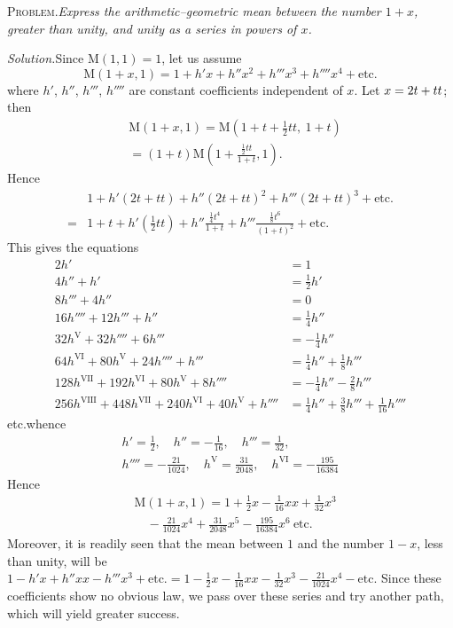 \begingroup
\renewcommand{\arraystretch}{1.45}

\textsc{Problem.}\quad \textit{Express the arithmetic–geometric mean between the number $1+x$, greater than unity, and unity as a series in powers of $x$.}

\textit{Solution.}\quad Since $\mathrm M(1,1)=1$, let us assume
\[
\mathrm M(1+x,1)=1+h'x+h''x^2+h'''x^3+h''''x^4+\text{etc.}
\]
where $h'$, $h''$, $h'''$, $h''''$ are constant coefficients independent of $x$.
Let $x=\nobreak{}2t+\nobreak{}tt$; then
\[
\begin{aligned}&\mathrm M(1+x,1)=\mathrm M(1+t+\tfrac12tt,\ 1+t)\\&=(1+t)\mathrm M(1+\frac{\tfrac12tt}{1+t},1).\end{aligned}
\]
Hence
\[
\begin{aligned}
&1+h'(2t+tt)+h''(2t+tt)^2+h'''(2t+tt)^3+\text{etc.}\\[6pt]
={}&1+t+h'(\tfrac12tt)+h''\frac{\tfrac14t^4}{1+t}+h'''\frac{\tfrac18t^6}{(1+t)^2}+\text{etc.}
\end{aligned}
\]
This gives the equations
\[
\begin{aligned}
2h'&=1\\[6pt]
4h''+h'&=\tfrac12h'\\[6pt]
8h'''+4h''&=0\\[6pt]
16h''''+12h'''+h''&=\tfrac14h''\\[6pt]
32h^{\mathrm V}+32h''''+6h'''&=-\tfrac14h''\\[6pt]
64h^{\mathrm{VI}}+80h^{\mathrm V}+24h''''+h'''&=\tfrac14h''+\tfrac18h'''\\[6pt]
128h^{\mathrm{VII}}+192h^{\mathrm{VI}}+80h^{\mathrm V}+8h''''&=-\tfrac14h''-\tfrac28h'''\\[6pt]
256h^{\mathrm{VIII}}+448h^{\mathrm{VII}}+240h^{\mathrm{VI}}+40h^{\mathrm V}+h''''&=\tfrac14h''+\tfrac38h'''+\tfrac1{16}h''''
\end{aligned}
\]
etc.\quad whence
\[
\begin{gathered}h'=\tfrac12,\quad h''=-\tfrac1{16},\quad h'''=\tfrac1{32},\\ h''''=-\tfrac{21}{1024},\quad h^{\mathrm V}=\tfrac{31}{2048},\quad h^{\mathrm{VI}}=-\tfrac{195}{16384}\end{gathered}
\]
Hence
\[
\begin{aligned}&\mathrm M(1+x,1)=1+\tfrac12x-\tfrac1{16}xx+\tfrac1{32}x^3\\&\quad-\tfrac{21}{1024}x^4+\tfrac{31}{2048}x^5-\tfrac{195}{16384}x^6\ \text{etc.}\end{aligned}
\]
Moreover, it is readily seen that the mean between $1$ and the number
\(1-x\), less than unity, will be \(1-h'x+h''xx-h'''x^3+\text{etc.}=1-\frac12x-\frac1{16}xx-\frac1{32}x^3-\frac{21}{1024}x^4-\text{etc.}\)
Since these coefficients show no obvious law, we pass over these series
and try another path, which will yield greater success.

